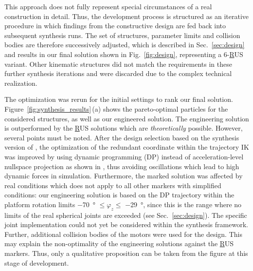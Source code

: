 \documentclass[runningheads,hidelinks]{llncs}
\begin{document}
This approach does not fully represent special circumstances of a real construction in detail. 
Thus, the development process is structured as an iterative procedure in which findings from the constructive design are fed back into subsequent synthesis runs. 
The set of structures, parameter limits and collision bodies are therefore successively adjusted, which is described in Sec.~\ref{sec:design} and results in our final solution shown in Fig.~\ref{fig:design}, representing a 6-\underline{R}US variant. 
Other kinematic structures did not match the requirements in these further synthesis iterations and were discarded due to the complex technical realization.

The optimization was rerun for the initial settings to rank our final solution. 
Figure~\ref{fig:synthesis_results}\,(a) shows the pareto-optimal particles for the considered structures, as well as our engineered solution.
The engineering solution is outperformed by the \underline{R}US solutions which are \emph{theoretically} possible. 
However, several points must be noted. 
After the design selection based on the synthesis version of \cite{Schappler2022_ARK_3T1R}, the optimization of the redundant coordinate within the trajectory IK was improved by using dynamic programming (DP) instead of acceleration-level nullspace projection as shown in \cite{Schappler2023_ICINCOLNEE}, thus avoiding oscillations which lead to high dynamic forces in simulation. 
Furthermore, the marked solution was affected by real conditions which does not apply to all other markers with simplified conditions: our engineering solution is based on the DP trajectory within the platform rotation limits \SI{-70}{\degree} $\leq \varphi_z \leq$ \SI{-29}{\degree}, since this is the range where no limits of the real spherical joints are exceeded (see Sec.~\ref{sec:design}). 
The specific joint implementation could not yet be considered within the synthesis framework.
Further, additional collision bodies of the motors were used for the design. 
This may explain the non-optimality of the engineering solutions against the \underline{R}US markers. 
Thus, only a qualitative proposition can be taken from the figure at this stage of development. 
\end{document}
